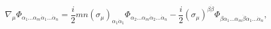 \begin{equation}
\nabla_\mu \Phi_{\alpha_1\ldots \alpha_m\dot \alpha_1\ldots
\dot\alpha_n} = \frac{i}2 mn (\sigma_\mu)_{\alpha_1\dot\alpha_1} 
\Phi_{\alpha_2\ldots \alpha_m\dot \alpha_2\ldots
\dot\alpha_n} - 
\frac{i}2 (\sigma_\mu)^{\beta\dot\beta} 
\Phi_{\beta\alpha_1\ldots \alpha_m\dot\beta \dot \alpha_1\ldots
\dot\alpha_n}, \label{eq:nablamuphi}
\end{equation}

